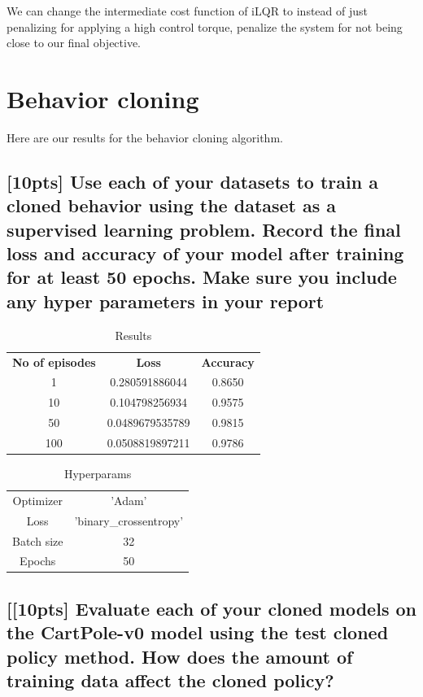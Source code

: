 \documentclass{article}
\begin{document}
We can change the intermediate cost function of iLQR to instead of just penalizing for applying a high control torque, penalize the system for not being close to our final objective. 




\section{Behavior cloning}
Here are our results for the behavior cloning algorithm. 

\subsection{[10pts] Use each of your datasets to train a cloned behavior using the dataset as a supervised learning problem. Record the final loss and accuracy of your model after training for at least 50 epochs. Make sure you include any hyper parameters in your report}

\begin{table}[H]
\centering
\caption{Results}
\label{my-label}
\begin{tabular}{ccc}
\textbf{No of episodes} & \textbf{Loss}  & \textbf{Accuracy} \\
1                       & 0.280591886044 & 0.8650    \\
10                     & 0.104798256934 & 0.9575   \\
50                     & 0.0489679535789 & 0.9815   \\
100                   & 0.0508819897211 & 0.9786
\end{tabular}
\end{table}


\begin{table}[H]
\centering
\caption{Hyperparams}
\label{my-label}
\begin{tabular}{cc}
Optimizer  & 'Adam'                 \\
Loss       & 'binary\_crossentropy' \\
Batch size & 32                     \\
Epochs     & 50                    
\end{tabular}
\end{table}


\subsection{[[10pts] Evaluate each of your cloned models on the CartPole-v0 model using the test cloned policy method. How does the amount of training data affect the cloned policy?}
\end{document}
